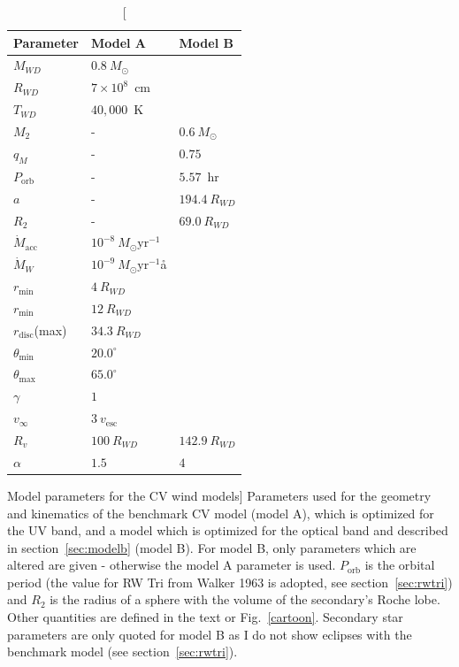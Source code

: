 \begin{table}
\centering
\begin{tabular}{p{2cm}p{2cm}p{2cm}}
\hline Parameter 	&	 Model A  & Model B \\ 
\hline \hline 
$M_{WD}$ 	 &	 $0.8~M_{\odot}$  &     \\ 
$R_{WD}$ 	 &	 $7\times10^{8}$~cm  & \\ 
$T_{WD}$ 	 &	 $40,000$~K        &  \\
$M_{2}$ 	& -&	 $0.6~M_{\odot}$   \\ 
$q_M$ 	&- &	 $0.75$   \\ 
$P_{\mathrm{orb}}$ 	&- &	 $5.57$~hr   \\ 
$a$ 	& -&	 $194.4~R_{WD}$   \\ 
$R_2$   &   -  &	 $69.0~R_{WD}$  \\ 
$\dot{M}_{\mathrm{acc}}$ 	 &	 $10^{-8}~M_{\odot}\mathrm{yr}^{-1}$  &\\ 
$\dot{M}_W$  &	$10^{-9}~M_{\odot}\mathrm{yr}^{-1}$å  & \\ 
$r_{\mathrm{min}}$ 	&	 $4~R_{WD}$ &  \\ 
$r_{\mathrm{min}}$ 	&	 $12~R_{WD}$  &  \\ 
$r_{\mathrm{disc}}$(max) 	&	 $34.3~R_{WD}$  &  \\ 
$\theta_{\mathrm{min}}$	&	 $20.0^{\circ}$  &  \\ 
$\theta_{\mathrm{max}}$ 	&	 $65.0^{\circ}$  &  \\ 
$\gamma$ 	&	 $1$  &  \\ 
$v_{\infty}$ 	&	 $3~v_{\mathrm{esc}}$  &  \\ 
$R_v$ 	        &	 $100~R_{WD}$  &  $142.9~R_{WD}$  \\ 
$\alpha$ 	&	 $1.5$   &   $4$\\
\hline 
\end{tabular} 
\centering
\caption
[Model parameters for the CV wind models]
{
Parameters used for the geometry and kinematics of the benchmark 
CV model (model A), which is optimized for the UV band, and a model
which is optimized for the optical band and described in section~\ref{sec:modelb} (model B).
For model B, only parameters which are altered are given - otherwise the
model A parameter is used. $P_{\mathrm{orb}}$ is the orbital period 
(the value for RW Tri from Walker 1963 is adopted, see section~\ref{sec:rwtri}) and 
$R_2$ is the radius of a sphere with the volume of the secondary's Roche lobe. 
Other quantities are defined in the text or Fig.~\ref{cartoon}.
Secondary star parameters are only quoted for 
model B as I do not show eclipses with the 
benchmark model (see section~\ref{sec:rwtri}).
}
\label{wind_param}
\label{modelb_table}
\end{table}

